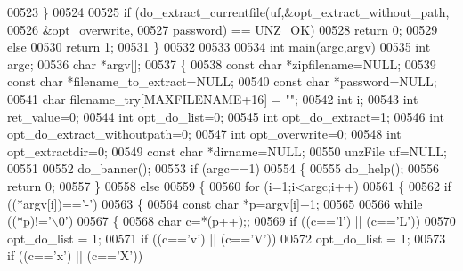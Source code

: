 \begin{DoxyCode}
{{{{{{{{{{{{{{{{{{{{00523     \}
00524 
00525     \textcolor{keywordflow}{if} (do\_extract\_currentfile(uf,&opt\_extract\_without\_path,
00526                                       &opt\_overwrite,
00527                                       password) == UNZ\_OK)
00528         \textcolor{keywordflow}{return} 0;
00529     \textcolor{keywordflow}{else}
00530         \textcolor{keywordflow}{return} 1;
00531 \}
00532 
00533 
00534 \textcolor{keywordtype}{int} main(argc,argv)
00535     \textcolor{keywordtype}{int} argc;
00536     \textcolor{keywordtype}{char} *argv[];
00537 \{
00538     \textcolor{keyword}{const} \textcolor{keywordtype}{char} *zipfilename=NULL;
00539     \textcolor{keyword}{const} \textcolor{keywordtype}{char} *filename\_to\_extract=NULL;
00540     \textcolor{keyword}{const} \textcolor{keywordtype}{char} *password=NULL;
00541     \textcolor{keywordtype}{char} filename\_try[MAXFILENAME+16] = \textcolor{stringliteral}{""};
00542     \textcolor{keywordtype}{int} i;
00543     \textcolor{keywordtype}{int} ret\_value=0;
00544     \textcolor{keywordtype}{int} opt\_do\_list=0;
00545     \textcolor{keywordtype}{int} opt\_do\_extract=1;
00546     \textcolor{keywordtype}{int} opt\_do\_extract\_withoutpath=0;
00547     \textcolor{keywordtype}{int} opt\_overwrite=0;
00548     \textcolor{keywordtype}{int} opt\_extractdir=0;
00549     \textcolor{keyword}{const} \textcolor{keywordtype}{char} *dirname=NULL;
00550     unzFile uf=NULL;
00551 
00552     do\_banner();
00553     \textcolor{keywordflow}{if} (argc==1)
00554     \{
00555         do\_help();
00556         \textcolor{keywordflow}{return} 0;
00557     \}
00558     \textcolor{keywordflow}{else}
00559     \{
00560         \textcolor{keywordflow}{for} (i=1;i<argc;i++)
00561         \{
00562             \textcolor{keywordflow}{if} ((*argv[i])==\textcolor{charliteral}{'-'})
00563             \{
00564                 \textcolor{keyword}{const} \textcolor{keywordtype}{char} *p=argv[i]+1;
00565 
00566                 \textcolor{keywordflow}{while} ((*p)!=\textcolor{charliteral}{'\(\backslash\)0'})
00567                 \{
00568                     \textcolor{keywordtype}{char} c=*(p++);;
00569                     \textcolor{keywordflow}{if} ((c==\textcolor{charliteral}{'l'}) || (c==\textcolor{charliteral}{'L'}))
00570                         opt\_do\_list = 1;
00571                     \textcolor{keywordflow}{if} ((c==\textcolor{charliteral}{'v'}) || (c==\textcolor{charliteral}{'V'}))
00572                         opt\_do\_list = 1;
00573                     \textcolor{keywordflow}{if} ((c==\textcolor{charliteral}{'x'}) || (c==\textcolor{charliteral}{'X'}))
}}}}}}}}}}}}}}}}}}}}
\end{DoxyCode}
